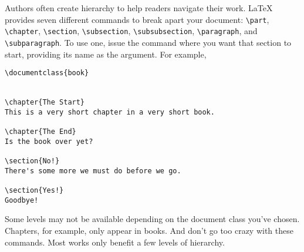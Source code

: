 Authors often create hierarchy to help readers navigate their work.
\LaTeX{} provides seven different commands to break apart your document:
\verb|\part|, \verb|\chapter|, \verb|\section|, \verb|\subsection|,
\verb|\subsubsection|, \verb|\paragraph|, and \verb|\subparagraph|.
To use one, issue the command where you want that section to start,
providing its name as the argument.
For example,
\begin{leftfigure}
\begin{lstlisting}
\documentclass{book}


\chapter{The Start}
This is a very short chapter in a very short book.

\chapter{The End}
Is the book over yet?

\section{No!}
There's some more we must do before we go.

\section{Yes!}
Goodbye!

\end{lstlisting}
\end{leftfigure}
Some levels may not be available depending on the document class
you've chosen. Chapters, for example, only appear in books.
And don't go too crazy with these commands.
Most works only benefit a few levels of hierarchy.

